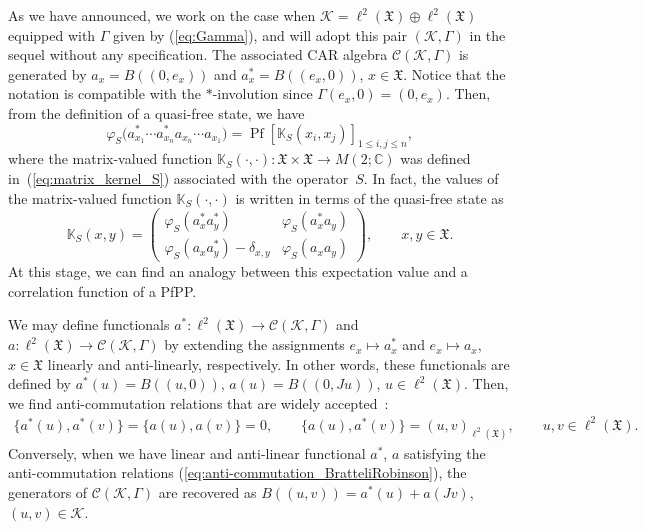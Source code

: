 \documentclass[pdftex]{sigma}
\numberwithin{equation}{section}
\newcommand{\pf}{\operatorname{Pf}}
\newcommand{\mfrak}[1]{\mathfrak{#1}}
\newcommand{\mcal}[1]{\mathcal{#1}}
\newcommand{\mbb}[1]{\mathbb{#1}}
\begin{document}
As we have announced, we work on the case when $\mcal{K}=\ell^{2}(\mfrak{X})\oplus\ell^{2}(\mfrak{X})$ equipped with $\Gamma$ given by (\ref{eq:Gamma}), and will adopt this pair $(\mcal{K},\Gamma)$ in the sequel without any specification.
The associated CAR algebra $\mcal{C}(\mcal{K},\Gamma)$ is generated by $a_{x}=B((0,e_{x}))$ and $a_{x}^{\ast}=B((e_{x},0))$, $x\in\mfrak{X}$.
Notice that the notation is compatible with the $\ast$-involution since $\Gamma (e_{x},0)=(0,e_{x})$.
Then, from the definition of a quasi-free state, we have
\begin{equation}
\label{eq:quasifree_correlation_function}
	\varphi_{S}\big(a_{x_{1}}^{\ast} \cdots a_{x_{n}}^{\ast}a_{x_{n}}\cdots a_{x_{1}}\big)=\pf [\mbb{K}_{S}(x_{i},x_{j}) ]_{1\le i,j\le n},
\end{equation}
where the matrix-valued function $\mbb{K}_{S}(\cdot,\cdot)\colon \mfrak{X}\times\mfrak{X}\to M(2;\mbb{C})$ was defined in~(\ref{eq:matrix_kernel_S}) associated with the operator~$S$. In fact, the values of the matrix-valued function $\mbb{K}_{S}(\cdot,\cdot)$ is written in terms of the quasi-free state as
\begin{equation*}
	\mbb{K}_{S}(x,y)=\left(
	\begin{matrix}
	\varphi_{S}(a_{x}^{\ast}a_{y}^{\ast}) & \varphi_{S}(a_{x}^{\ast}a_{y}) \\
	\varphi_{S}(a_{x}a_{y}^{\ast})-\delta_{x,y} & \varphi_{S}(a_{x}a_{y})
	\end{matrix}
	\right),\qquad x,y\in\mfrak{X}.
\end{equation*}
At this stage, we can find an analogy between this expectation value and a correlation function of a PfPP.

\begin{Remark}\label{rem:equivalence_CAR}
We may define functionals $a^{\ast}\colon \ell^{2}(\mfrak{X})\to \mcal{C}(\mcal{K},\Gamma)$ and $a\colon \ell^{2}(\mfrak{X})\to \mcal{C}(\mcal{K},\Gamma)$ by extending the assignments $e_{x}\mapsto a_{x}^{\ast}$ and $e_{x}\mapsto a_{x}$, $x\in\mfrak{X}$ linearly and anti-linearly, respectively. In other words, these functionals are defined by $a^{\ast}(u)=B((u,0))$, $a(u)=B((0,Ju))$, $u\in \ell^{2}(\mfrak{X})$.
Then, we find anti-commutation relations that are widely accepted~\cite{BratteliRobinson1997}:
\begin{gather}\label{eq:anti-commutation_BratteliRobinson}
	 \{a^{\ast}(u),a^{\ast}(v)\}=\{a(u),a(v)\}=0, \qquad
	 \{a(u),a^{\ast}(v)\}=(u,v)_{\ell^{2}(\mfrak{X})}, \qquad u,v\in \ell^{2}(\mfrak{X}).
\end{gather}
Conversely, when we have linear and anti-linear functional $a^{\ast}$, $a$ satisfying the anti-commutation relations (\ref{eq:anti-commutation_BratteliRobinson}), the generators of $\mcal{C}(\mcal{K},\Gamma)$ are recovered as $B((u,v))=a^{\ast}(u)+a(Jv)$, $(u,v)\in\mcal{K}$.
\end{Remark}
\end{document}
